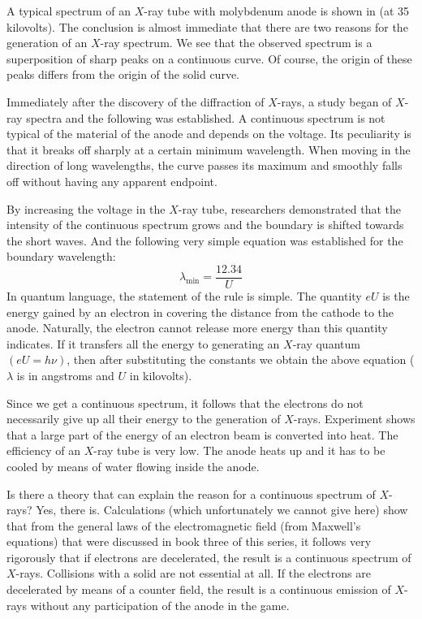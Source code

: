 A typical spectrum of an $X$-ray tube with molybdenum anode is shown in  (at 35 kilovolts). The con­clusion is almost immediate that there are two reasons for the generation of an $X$-ray spectrum. We see that the observed spectrum is a superposition of sharp peaks on a continuous curve. Of course, the origin of these peaks differs from the origin of the solid curve.

Immediately after the discovery of the diffraction of $X$-rays, a study began of $X$-ray spectra and the following was established. A continuous spectrum is not typical of the material of the anode and depends on the voltage. Its peculiarity is that it breaks off sharply at a certain minimum wavelength. When moving in the direction of long wavelengths, the curve passes its maximum and smoothly falls off without having any apparent endpoint.

By increasing the voltage in the $X$-ray tube, researchers demonstrated that the intensity of the continuous spec­trum grows and the boundary is shifted towards the short waves. And the following very simple equation was estab­lished for the boundary wavelength:
\begin{equation*}%
\lambda_{\textrm{min}} = \frac{12.34}{U}
\end{equation*}
In quantum language, the statement of the rule is simple. The quantity $eU$ is the energy gained by an electron in covering the distance from the cathode to the anode. Naturally, the electron cannot release more energy than this quantity indicates. If it transfers all the energy to generating an $X$-ray quantum $(eU=h\nu)$, then after sub­stituting the constants we obtain the above equation ($\lambda$ is in angstroms and $U$ in kilovolts).

Since we get a continuous spectrum, it follows that the electrons do not necessarily give up all their energy to the generation of $X$-rays. Experiment shows that a large part of the energy of an electron beam is converted into heat. The efficiency of an $X$-ray tube is very low. The anode heats up and it has to be cooled by means of water flowing inside the anode.

Is there a theory that can explain the reason for a continuous spectrum of $X$-rays? Yes, there is. Calculations (which unfortunately we cannot give here) show that from the general laws of the electromagnetic field (from Maxwell's equations) that were discussed in book three of this series, it follows very rigorously that if electrons are decelerated, the result is a continuous spectrum of $X$-rays. Collisions with a solid are not essential at all. If the electrons are decelerated by means of a counter­ field, the result is a continuous emission of $X$-rays without any participation of the anode in the game.

